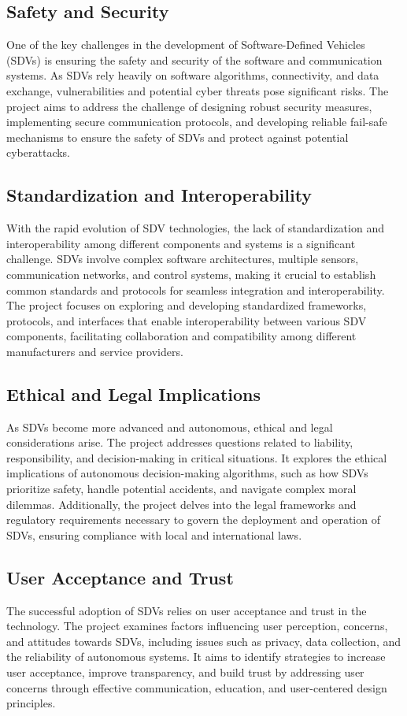 \documentclass[
12pt,
oneside, 
onehalfspacing, 
nolistspacing, 
parskip, 
chapterinoneline, 
]{AASTCOMPUTER}
\begin{document}
\subsection{Safety and Security}
One of the key challenges in the development of Software-Defined Vehicles (SDVs) is ensuring the safety and security of the software and communication systems. As SDVs rely heavily on software algorithms, connectivity, and data exchange, vulnerabilities and potential cyber threats pose significant risks. The project aims to address the challenge of designing robust security measures, implementing secure communication protocols, and developing reliable fail-safe mechanisms to ensure the safety of SDVs and protect against potential cyberattacks.

\subsection{Standardization and Interoperability}
With the rapid evolution of SDV technologies, the lack of standardization and interoperability among different components and systems is a significant challenge. SDVs involve complex software architectures, multiple sensors, communication networks, and control systems, making it crucial to establish common standards and protocols for seamless integration and interoperability. The project focuses on exploring and developing standardized frameworks, protocols, and interfaces that enable interoperability between various SDV components, facilitating collaboration and compatibility among different manufacturers and service providers.
\subsection{Ethical and Legal Implications}
As SDVs become more advanced and autonomous, ethical and legal considerations arise. The project addresses questions related to liability, responsibility, and decision-making in critical situations. It explores the ethical implications of autonomous decision-making algorithms, such as how SDVs prioritize safety, handle potential accidents, and navigate complex moral dilemmas. Additionally, the project delves into the legal frameworks and regulatory requirements necessary to govern the deployment and operation of SDVs, ensuring compliance with local and international laws.

\subsection{User Acceptance and Trust}
The successful adoption of SDVs relies on user acceptance and trust in the technology. The project examines factors influencing user perception, concerns, and attitudes towards SDVs, including issues such as privacy, data collection, and the reliability of autonomous systems. It aims to identify strategies to increase user acceptance, improve transparency, and build trust by addressing user concerns through effective communication, education, and user-centered design principles.
\end{document}
